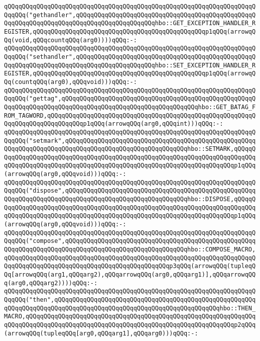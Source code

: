 \verb|qQQqqQQqqQQqqQQqqQQqqQQqqQQqqQQqqQQqqQQqqQQqqQQqqQQqqQQqqQQqqQQqqQQqqQQqqQQq("gethandler",qQQqqQQqqQQqqQQqqQQqqQQqqQQqqQQqqQQqqQQqqQQqqQQqqQQqqQQqqQQqqQQqqQQqqQQqqQQqqQQqqQQqqQQqqQQqhbo::GET_EXCEPTION_HANDLER_REGISTER,qQQqqQQqqQQqqQQqqQQqqQQqqQQqqQQqqQQqqQQqqQQqqQQqp1qQQq(arrowqQQq(void,qQQqcountqQQq(arg0))))qQQq:-:|\newline
\verb|qQQqqQQqqQQqqQQqqQQqqQQqqQQqqQQqqQQqqQQqqQQqqQQqqQQqqQQqqQQqqQQqqQQqqQQqqQQq("sethandler",qQQqqQQqqQQqqQQqqQQqqQQqqQQqqQQqqQQqqQQqqQQqqQQqqQQqqQQqqQQqqQQqqQQqqQQqqQQqqQQqqQQqqQQqqQQqhbo::SET_EXCEPTION_HANDLER_REGISTER,qQQqqQQqqQQqqQQqqQQqqQQqqQQqqQQqqQQqqQQqqQQqqQQqp1qQQq(arrowqQQq(countqQQq(arg0),qQQqvoid)))qQQq:-:|\newline
\verb|qQQqqQQqqQQqqQQqqQQqqQQqqQQqqQQqqQQqqQQqqQQqqQQqqQQqqQQqqQQqqQQqqQQqqQQqqQQq("gettag",qQQqqQQqqQQqqQQqqQQqqQQqqQQqqQQqqQQqqQQqqQQqqQQqqQQqqQQqqQQqqQQqqQQqqQQqqQQqqQQqqQQqqQQqqQQqqQQqqQQqqQQqqQQqhbo::GET_BATAG_FROM_TAGWORD,qQQqqQQqqQQqqQQqqQQqqQQqqQQqqQQqqQQqqQQqqQQqqQQqqQQqqQQqqQQqqQQqqQQqqQQqqQQqqQQqp1qQQq(arrowqQQq(arg0,qQQqint)))qQQq:-:|\newline
\verb|qQQqqQQqqQQqqQQqqQQqqQQqqQQqqQQqqQQqqQQqqQQqqQQqqQQqqQQqqQQqqQQqqQQqqQQqqQQq("setmark",qQQqqQQqqQQqqQQqqQQqqQQqqQQqqQQqqQQqqQQqqQQqqQQqqQQqqQQqqQQqqQQqqQQqqQQqqQQqqQQqqQQqqQQqqQQqqQQqqQQqqQQqhbo::SETMARK,qQQqqQQqqQQqqQQqqQQqqQQqqQQqqQQqqQQqqQQqqQQqqQQqqQQqqQQqqQQqqQQqqQQqqQQqqQQqqQQqqQQqqQQqqQQqqQQqqQQqqQQqqQQqqQQqqQQqqQQqqQQqqQQqqQQqqQQqqQQqp1qQQq(arrowqQQq(arg0,qQQqvoid)))qQQq:-:|\newline
\verb|qQQqqQQqqQQqqQQqqQQqqQQqqQQqqQQqqQQqqQQqqQQqqQQqqQQqqQQqqQQqqQQqqQQqqQQqqQQq("dispose",qQQqqQQqqQQqqQQqqQQqqQQqqQQqqQQqqQQqqQQqqQQqqQQqqQQqqQQqqQQqqQQqqQQqqQQqqQQqqQQqqQQqqQQqqQQqqQQqqQQqqQQqhbo::DISPOSE,qQQqqQQqqQQqqQQqqQQqqQQqqQQqqQQqqQQqqQQqqQQqqQQqqQQqqQQqqQQqqQQqqQQqqQQqqQQqqQQqqQQqqQQqqQQqqQQqqQQqqQQqqQQqqQQqqQQqqQQqqQQqqQQqqQQqqQQqqQQqp1qQQq(arrowqQQq(arg0,qQQqvoid)))qQQq:-:|\newline
\verb|qQQqqQQqqQQqqQQqqQQqqQQqqQQqqQQqqQQqqQQqqQQqqQQqqQQqqQQqqQQqqQQqqQQqqQQqqQQq("compose",qQQqqQQqqQQqqQQqqQQqqQQqqQQqqQQqqQQqqQQqqQQqqQQqqQQqqQQqqQQqqQQqqQQqqQQqqQQqqQQqqQQqqQQqqQQqqQQqqQQqqQQqhbo::COMPOSE_MACRO,qQQqqQQqqQQqqQQqqQQqqQQqqQQqqQQqqQQqqQQqqQQqqQQqqQQqqQQqqQQqqQQqqQQqqQQqqQQqqQQqqQQqqQQqqQQqqQQqqQQqqQQqqQQqqQQqqQQqp3qQQq(arrowqQQq(tupleqQQq[arrowqQQq(arg1,qQQqarg2),qQQqarrowqQQq(arg0,qQQqarg1)],qQQqarrowqQQq(arg0,qQQqarg2))))qQQq:-:|\newline
\verb|qQQqqQQqqQQqqQQqqQQqqQQqqQQqqQQqqQQqqQQqqQQqqQQqqQQqqQQqqQQqqQQqqQQqqQQqqQQq("then",qQQqqQQqqQQqqQQqqQQqqQQqqQQqqQQqqQQqqQQqqQQqqQQqqQQqqQQqqQQqqQQqqQQqqQQqqQQqqQQqqQQqqQQqqQQqqQQqqQQqqQQqqQQqqQQqqQQqhbo::THEN_MACRO,qQQqqQQqqQQqqQQqqQQqqQQqqQQqqQQqqQQqqQQqqQQqqQQqqQQqqQQqqQQqqQQqqQQqqQQqqQQqqQQqqQQqqQQqqQQqqQQqqQQqqQQqqQQqqQQqqQQqqQQqqQQqqQQqp2qQQq(arrowqQQq(tupleqQQq[arg0,qQQqarg1],qQQqarg0)))qQQq:-:|\newline
